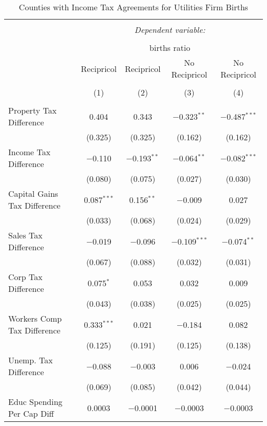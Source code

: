 
\begin{table}[!htbp] \centering 
  \caption{Counties with Income Tax Agreements for  Utilities Firm Births} 
  \label{22agreement} 
\begin{tabular}{@{\extracolsep{5pt}}lcccc} 
\\[-1.8ex]\hline 
\hline \\[-1.8ex] 
 & \multicolumn{4}{c}{\textit{Dependent variable:}} \\ 
\cline{2-5} 
\\[-1.8ex] & \multicolumn{4}{c}{births ratio} \\ 
 & Recipricol & Recipricol & No Recipricol & No Recipricol \\ 
\\[-1.8ex] & (1) & (2) & (3) & (4)\\ 
\hline \\[-1.8ex] 
 Property Tax Difference & 0.404 & 0.343 & $-$0.323$^{**}$ & $-$0.487$^{***}$ \\ 
  & (0.325) & (0.325) & (0.162) & (0.162) \\ 
  Income Tax Difference & $-$0.110 & $-$0.193$^{**}$ & $-$0.064$^{**}$ & $-$0.082$^{***}$ \\ 
  & (0.080) & (0.075) & (0.027) & (0.030) \\ 
  Capital Gains Tax Difference & 0.087$^{***}$ & 0.156$^{**}$ & $-$0.009 & 0.027 \\ 
  & (0.033) & (0.068) & (0.024) & (0.029) \\ 
  Sales Tax Difference & $-$0.019 & $-$0.096 & $-$0.109$^{***}$ & $-$0.074$^{**}$ \\ 
  & (0.067) & (0.088) & (0.032) & (0.031) \\ 
  Corp Tax Difference & 0.075$^{*}$ & 0.053 & 0.032 & 0.009 \\ 
  & (0.043) & (0.038) & (0.025) & (0.025) \\ 
  Workers Comp Tax Difference & 0.333$^{***}$ & 0.021 & $-$0.184 & 0.082 \\ 
  & (0.125) & (0.191) & (0.125) & (0.138) \\ 
  Unemp. Tax Difference & $-$0.088 & $-$0.003 & 0.006 & $-$0.024 \\ 
  & (0.069) & (0.085) & (0.042) & (0.044) \\ 
  Educ Spending Per Cap Diff & 0.0003 & $-$0.0001 & $-$0.0003 & $-$0.0003 \\ 

\end{tabular}
\end{table}
